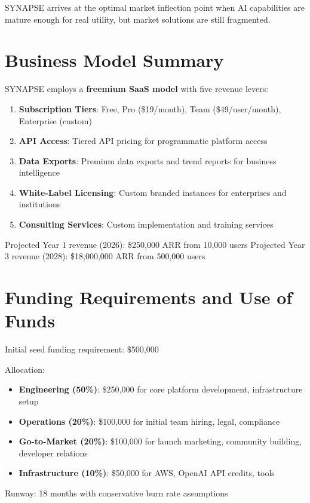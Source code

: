 \documentclass{report}
\begin{document}
SYNAPSE arrives at the optimal market inflection point when AI capabilities are mature enough for real utility, but market solutions are still fragmented.

\section{Business Model Summary}

SYNAPSE employs a \textbf{freemium SaaS model} with five revenue levers:

\begin{enumerate}
    \item \textbf{Subscription Tiers}: Free, Pro (\$19/month), Team (\$49/user/month), Enterprise (custom)
    \item \textbf{API Access}: Tiered API pricing for programmatic platform access
    \item \textbf{Data Exports}: Premium data exports and trend reports for business intelligence
    \item \textbf{White-Label Licensing}: Custom branded instances for enterprises and institutions
    \item \textbf{Consulting Services}: Custom implementation and training services
\end{enumerate}

Projected Year 1 revenue (2026): \$250,000 ARR from 10,000 users
Projected Year 3 revenue (2028): \$18,000,000 ARR from 500,000 users

\section{Funding Requirements and Use of Funds}

Initial seed funding requirement: \$500,000

Allocation:
\begin{itemize}
    \item \textbf{Engineering (50\%)}: \$250,000 for core platform development, infrastructure setup
    \item \textbf{Operations (20\%)}: \$100,000 for initial team hiring, legal, compliance
    \item \textbf{Go-to-Market (20\%)}: \$100,000 for launch marketing, community building, developer relations
    \item \textbf{Infrastructure (10\%)}: \$50,000 for AWS, OpenAI API credits, tools
\end{itemize}

Runway: 18 months with conservative burn rate assumptions
\end{document}
